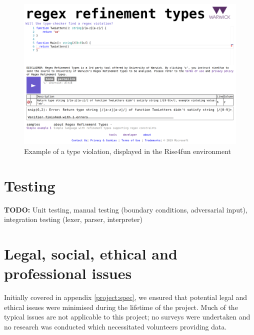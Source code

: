 \documentclass[a4paper,openany,12pt]{book}
\newcommand{\todobox}[1] {\colorbox{todocolor}{\parbox{\dimexpr \linewidth-\columnsep}{\vspace{.75\baselineskip}\centering\parbox{0.95\linewidth}{\faIcon{lightbulb} \textbf{TODO:} #1\vspace{.75\baselineskip}}}}}
\begin{document}
\begin{figure}[H]
    \begin{MyMdframed}
        \vspace{0.5em}
        
        
        \caption{\label{figure:r4f}Example of a type violation, displayed in the Rise4fun environment}
        \vspace{0.5em}
        \captionsetup{style=default}
        
        \centering \includegraphics[width=0.9\linewidth]{rise4fun.png}
    \end{MyMdframed}
\end{figure}



\chapter{Testing}

\todobox{Unit testing, manual testing (boundary conditions, adversarial input), integration testing (lexer, parser, interpreter)}

\chapter[Legal, social, ethical and professional issues]{Legal, social, ethical and\\professional issues}

Initially covered in appendix \ref{project:spec}, we ensured that potential legal and ethical issues were minimised
during the lifetime of the project.
Much of the typical issues are not applicable to this project; no surveys were undertaken and no research was
conducted which necessitated volunteers providing data.
\end{document}
